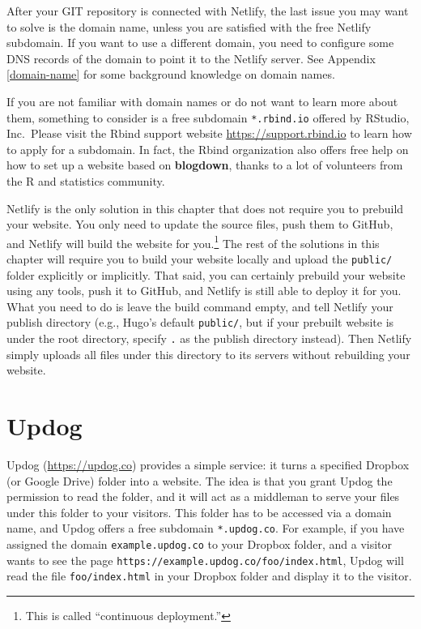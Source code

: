 \documentclass[12pt,]{krantz}
\theoremstyle{definition}
\theoremstyle{definition}
\theoremstyle{definition}
\theoremstyle{remark}
\begin{document}
After your GIT repository is connected with Netlify, the last issue you
may want to solve is the domain name, unless you are
satisfied with the free Netlify subdomain. If you want to use a
different domain, you need to configure some DNS records of the domain
to point it to the Netlify server. See Appendix \ref{domain-name} for
some background knowledge on domain names.

If you are not familiar with domain names or do not want to learn more
about them, something to consider is a free subdomain
\texttt{*.rbind.io} offered by RStudio, Inc.~Please visit the Rbind
support website \url{https://support.rbind.io} to learn how to apply for
a subdomain. In fact, the Rbind organization also offers free help on
how to set up a website based on \textbf{blogdown}, thanks to a lot of
volunteers from the R and statistics community.

Netlify is the only solution in this chapter that does not require you
to prebuild your website. You only need to update the source files, push
them to GitHub, and Netlify will build the website for you.\footnote{This
  is called ``continuous deployment.''} The rest of the solutions in
this chapter will require you to build your website locally and upload
the \texttt{public/} folder explicitly or implicitly. That said, you can
certainly prebuild your website using any tools, push it to GitHub, and
Netlify is still able to deploy it for you. What you need to do is leave
the build command empty, and tell Netlify your publish directory (e.g.,
Hugo's default \texttt{public/}, but if your prebuilt website is under
the root directory, specify \texttt{.} as the publish directory
instead). Then Netlify simply uploads all files under this directory to
its servers without rebuilding your website.

\hypertarget{updog}{%
\section{Updog}\label{updog}}

Updog (\url{https://updog.co}) provides a simple service:
it turns a specified Dropbox (or Google Drive) folder into a website.
The idea is that you grant Updog the permission to read the folder, and
it will act as a middleman to serve your files under this folder to your
visitors. This folder has to be accessed via a domain name, and Updog
offers a free subdomain \texttt{*.updog.co}. For example, if you have
assigned the domain \texttt{example.updog.co} to your Dropbox folder,
and a visitor wants to see the page
\texttt{https://example.updog.co/foo/index.html}, Updog will read the
file \texttt{foo/index.html} in your Dropbox folder and display it to
the visitor.
\end{document}
